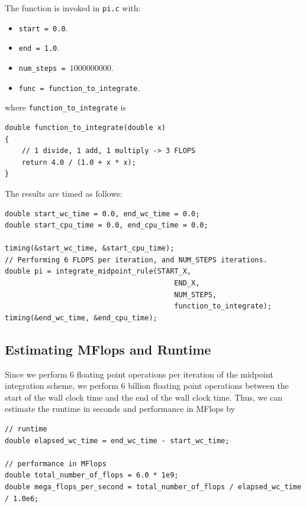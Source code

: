 \documentclass{article}
\begin{document}
The function is invoked in \texttt{pi.c} with:
\begin{itemize}
    \item \texttt{start = 0.0}.
    \item \texttt{end = 1.0}.
    \item \texttt{num\_steps = $1000000000$}.
    \item \texttt{func = \texttt{function\_to\_integrate}}.
\end{itemize}
where \texttt{function\_to\_integrate} is 
\begin{lstlisting}
double function_to_integrate(double x)
{
    // 1 divide, 1 add, 1 multiply -> 3 FLOPS
    return 4.0 / (1.0 + x * x);
}
\end{lstlisting}
The results are timed as follows:
\begin{lstlisting}
double start_wc_time = 0.0, end_wc_time = 0.0;
double start_cpu_time = 0.0, end_cpu_time = 0.0;

timing(&start_wc_time, &start_cpu_time);
// Performing 6 FLOPS per iteration, and NUM_STEPS iterations.
double pi = integrate_midpoint_rule(START_X,
                                        END_X,
                                        NUM_STEPS,
                                        function_to_integrate);
timing(&end_wc_time, &end_cpu_time);
\end{lstlisting}
\subsection*{Estimating MFlops and Runtime}
Since we perform 6 floating point operations per iteration of the midpoint integration scheme, 
we perform 6 billion floating point operations between the start of the wall clock time 
and the end of the wall clock time. Thus, we can estimate the runtime in seconds and performance in MFlops by 
\begin{lstlisting}
// runtime
double elapsed_wc_time = end_wc_time - start_wc_time;

// performance in MFlops
double total_number_of_flops = 6.0 * 1e9;
double mega_flops_per_second = total_number_of_flops / elapsed_wc_time / 1.0e6;
\end{lstlisting}
\end{document}
